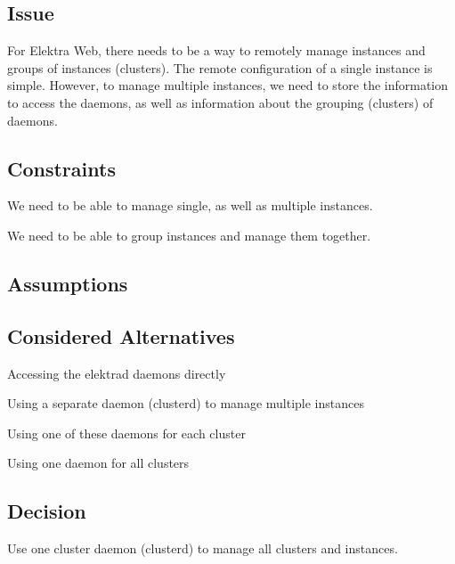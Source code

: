 \subsection*{Issue}

For Elektra Web, there needs to be a way to remotely manage instances and groups of instances (clusters). The remote configuration of a single instance is simple. However, to manage multiple instances, we need to store the information to access the daemons, as well as information about the grouping (clusters) of daemons.

\subsection*{Constraints}


\begin{DoxyItemize}
\item We need to be able to manage single, as well as multiple instances.
\item We need to be able to group instances and manage them together.
\end{DoxyItemize}

\subsection*{Assumptions}

\subsection*{Considered Alternatives}


\begin{DoxyItemize}
\item Accessing the elektrad daemons directly
\item Using a separate daemon (clusterd) to manage multiple instances
\begin{DoxyItemize}
\item Using one of these daemons for each cluster
\item Using one daemon for all clusters
\end{DoxyItemize}
\end{DoxyItemize}

\subsection*{Decision}

Use one cluster daemon (clusterd) to manage all clusters and instances.

